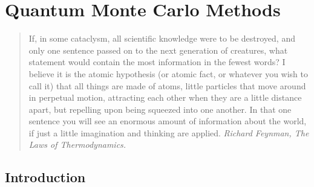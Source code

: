 


\chapter{Quantum  Monte Carlo Methods}\label{chap:mcvar}

\begin{quotation}
If, in some cataclysm, all scientific knowledge were to be destroyed, and only one sentence passed 
on to the next generation of creatures, what statement would contain the most information in the fewest words? 
I believe it is the atomic hypothesis (or atomic fact, or whatever you wish to call it) that all 
things are made of atoms, little particles that move around in perpetual motion, 
attracting each other when they are a little distance apart, but repelling upon being squeezed 
into one another. In that one sentence you will see an enormous amount of information about the world, 
if just a little imagination and thinking are applied. {\em Richard Feynman, The Laws of Thermodynamics.}
\end{quotation}

\section{Introduction}

